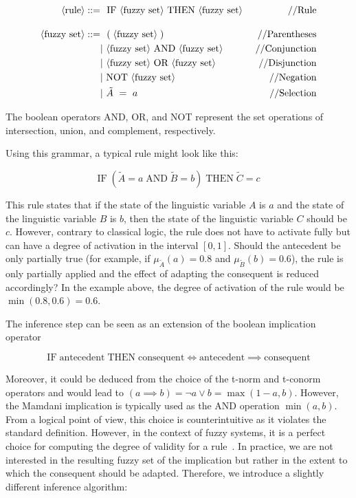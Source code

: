 \newcommand{\fuzzyrule}{\langle \text{rule} \rangle}


\begin{align*}
      \fuzzyrule  ::= & \ \ \text{IF} \ \fuzzyset \ \text{THEN} \ \fuzzyset & \text { //Rule}        \\[10pt]
      \fuzzyset  ::=  & \ \ (\; \fuzzyset \;)                               & \text { //Parentheses} \\
                      & |  \ \fuzzyset \ \text{AND}  \ \fuzzyset            & \text { //Conjunction} \\
                      & |  \ \fuzzyset \ \text{OR} \  \fuzzyset             & \text { //Disjunction} \\
                      & |  \ \text{NOT} \ \fuzzyset                         & \text { //Negation}    \\
                      & |  \ \tilde{A} \ =\ a                               & \text { //Selection}   \\
\end{align*}

The boolean operators AND, OR, and NOT represent the set operations of intersection, union, and complement, respectively.


Using this grammar, a typical rule might look like this:

\begin{equation}
      \text{IF} \;( \tilde{A} = a \; \text{AND} \; \tilde{B} = b )\; \text{THEN} \; \tilde{C} = c
\end{equation}

This rule states that if the state of the linguistic variable $A$ is $a$ and the state of the linguistic variable $B$ is $b$, then the state of the linguistic variable $C$ should be $c$. However, contrary to classical logic, the rule does not have to activate fully but can have a degree of activation in the interval $[0, 1]$. Should the antecedent be only partially true (for example, if $\mu_{\tilde{A}}(a) = 0.8$ and $\mu_{\tilde{B}}(b) = 0.6$), the rule is only partially applied and the effect of adapting the consequent is reduced accordingly? In the example above, the degree of activation of the rule would be $\min(0.8, 0.6) = 0.6$.

The inference step can be seen as an extension of the boolean implication operator

\[\text{IF} \; \text{antecedent} \; \text{THEN} \; \text{consequent} \iff \text{antecedent} \implies \text{consequent}\]

Moreover, it could be deduced from the choice of the t-norm and t-conorm operators and would lead to $(a \implies b) = \neg a \lor b = \max(1-a,b)$. However, the Mamdani implication is typically used as the AND operation $\min(a,b)$. From a logical point of view, this choice is counterintuitive as it violates the standard definition. However, in the context of fuzzy systems, it is a perfect choice for computing the degree of validity for a rule~\cite {BouchonMeunier1995}. In practice, we are not interested in the resulting fuzzy set of the implication but rather in the extent to which the consequent should be adapted. Therefore, we introduce a slightly different inference algorithm:

